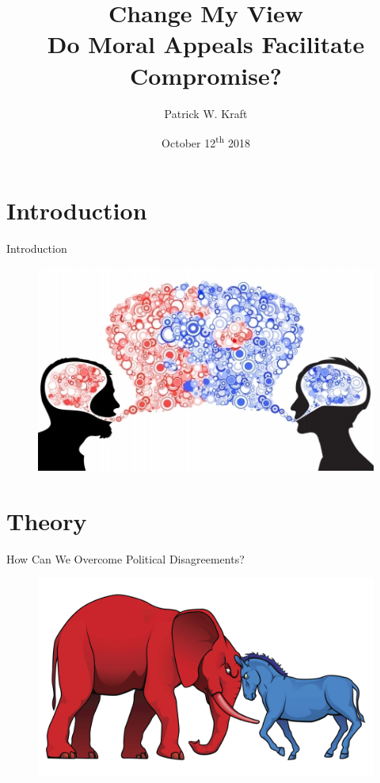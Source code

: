 \documentclass{beamer}
\author{Patrick W. Kraft}
\title{Change My View\\
{\large Do Moral Appeals Facilitate Compromise?}}
\institute{MAPPS Meeting\\Marquette University}
\date{October 12\textsuperscript{th} 2018}
\begin{document}
\section{Introduction}

\frame{\titlepage}

\begin{frame}{Introduction}
\begin{figure}
\includegraphics[scale=.9]{fig/the-conversation.jpeg}
\end{figure}
\end{frame}


\section{Theory}

\begin{frame}{How Can We Overcome Political Disagreements?}
\begin{figure}
\includegraphics[width=\textwidth]{fig/polarization_large.jpeg}
\end{figure}
\end{frame}
\end{document}
